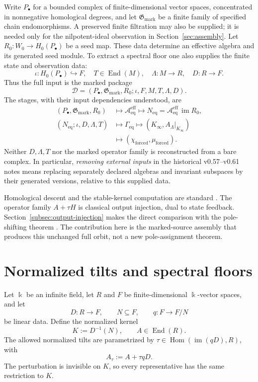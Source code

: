 \documentclass[11pt]{amsart}
\theoremstyle{definition}
\newcommand{\kk}{\Bbbk}
\newcommand{\im}{\operatorname{im}}
\newcommand{\End}{\operatorname{End}}
\newcommand{\Hom}{\operatorname{Hom}}
\newcommand{\Aeff}{\mathscr A_{\mathrm{eq}}^{\mathrm{eff}}}
\newcommand{\Neq}{N_{\mathrm{eq}}}
\newcommand{\Geq}{\Gamma_{\mathrm{eq}}}
\newcommand{\Gmark}{\mathfrak G_{\mathrm{mark}}}
\newcommand{\forced}{\mathrm{forced}}
\begin{document}
Write \(P_\bullet\) for a bounded complex of finite-dimensional vector spaces,
concentrated in nonnegative homological degrees, and let \(\Gmark\) be a finite family
of specified chain endomorphisms. A preserved finite filtration may also be supplied;
it is needed only for the nilpotent-ideal observation in Section~\ref{sec:assembly}. Let
\(R_0:W_0\to H_0(P_\bullet)\) be a seed map. These data determine an effective algebra
and its generated seed module. To extract a spectral floor one also supplies the
finite state and observation data:
\[
\iota:H_0(P_\bullet)\hookrightarrow F,\quad
T\in\End(M),\quad \Lambda:M\to R,\quad D:R\to F.
\]
Thus the full input is the marked package
\[
\mathcal D=(P_\bullet,\Gmark,R_0;\iota,F,M,T,\Lambda,D).
\]
The stages, with their input dependencies understood, are
\begin{equation}
\begin{aligned}
(P_\bullet,\Gmark,R_0)&\longmapsto\Aeff
                  \longmapsto\Neq=\Aeff\,\im R_0,\\
(\Neq;\iota,D,\Lambda,T)&\longmapsto\Geq
                  \longmapsto(K_\infty,A_\Lambda|_{K_\infty})\\
&\longmapsto(\chi_{\forced},\mu_{\forced}).
\end{aligned}
\label{eq:pipeline}
\end{equation}
Neither \(D,\Lambda,T\) nor the marked operator family is reconstructed from a bare
complex. In particular, \emph{removing external inputs} in the historical v0.57--v0.61
notes means replacing separately declared algebras and invariant subspaces by their
generated versions, relative to this supplied data.

Homological descent and the stable-kernel computation are standard
\cite{StacksHomotopy,Kalman1963,BoydLall}. The operator family $A+\tau H$
is classical output injection, dual to state feedback.
Section~\ref{subsec:output-injection} makes the direct comparison with the
pole-shifting theorem \cite[Section~5.1, Theorem~13]{Sontag1998}.
The contribution here is the marked-source assembly that produces this
unchanged full orbit, not a new pole-assignment theorem.

\section{Normalized tilts and spectral floors}

Let \(\kk\) be an infinite field, let \(R\) and \(F\) be finite-dimensional \(\kk\)-vector spaces, and let
\[
D:R\longrightarrow F, \qquad N\subseteq F, \qquad q:F\longrightarrow F/N
\]
be linear data. Define the normalized kernel
\begin{equation}
K:=D^{-1}(N),
\qquad A\in\End(R).
\label{eq:K}
\end{equation}
The allowed normalized tilts are parametrized by \(\tau\in\Hom(\im(qD),R)\), with
\begin{equation}
A_\tau:=A+\tau qD.
\label{eq:tilt}
\end{equation}
The perturbation is invisible on \(K\), so every representative has the same restriction to
\(K\).
\end{document}
